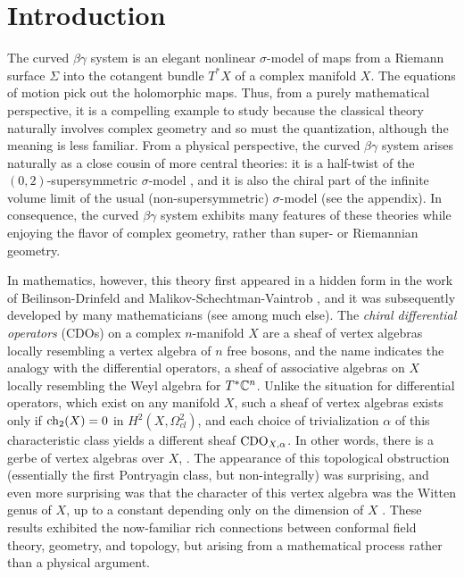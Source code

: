\part*{Introduction}


The curved $\beta\gamma$ system is an elegant nonlinear $\sigma$-model of maps from a Riemann surface $\Sigma$ into the cotangent bundle $T^*X$ of a complex manifold $X$. The equations of motion pick out the holomorphic maps. Thus, from a purely mathematical perspective, it is a compelling example to study 
because the classical theory naturally involves complex geometry and so must the quantization, although the meaning is less familiar. From a physical perspective, the curved $\beta\gamma$ system arises naturally as a close cousin of more central theories: it is a half-twist of the $(0,2)$-supersymmetric $\sigma$-model \cite{WittenCDO}, and it is also the chiral part of the infinite volume limit of the usual (non-supersymmetric) $\sigma$-model (see the appendix). In consequence, the curved $\beta\gamma$ system exhibits many features of these theories while enjoying the flavor of complex geometry, rather than super- or Riemannian geometry.

In mathematics, however, this theory first appeared in a hidden form in the work of Beilinson-Drinfeld and Malikov-Schechtman-Vaintrob \cite{BD,MSV}, and it was subsequently developed by many mathematicians (see \cite{KV,Cheung,Bressler} among much else). The {\em chiral differential operators} (CDOs) on a complex $n$-manifold $X$ are a sheaf of vertex algebras locally resembling a vertex algebra of $n$ free bosons, and the name indicates the analogy with the differential operators, a sheaf of associative algebras on $X$ locally resembling the Weyl algebra for $T^*\mathbb C^n$. Unlike the situation for differential operators, which exist on any manifold $X$, such a sheaf of vertex algebras exists only if ${\rm ch}_2(X) = 0$ in $H^2(X, \Omega^2_{cl})$, and each choice of trivialization $\alpha$ of this characteristic class yields a different sheaf ${\rm CDO}_{X,\alpha}$. In other words, there is a gerbe of vertex algebras over $X$, \cite{GMS}. The appearance of this topological obstruction (essentially the first Pontryagin class, but non-integrally) was surprising, and even more surprising was that the character of this vertex algebra was the Witten genus of $X$, up to a constant depending only on the dimension of $X$ \cite{BorLib}. These results exhibited the now-familiar rich connections between conformal field theory, geometry, and topology, but arising from a mathematical process rather than a physical argument. 

